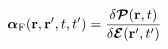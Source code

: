 \documentclass[preview]{standalone}
\begin{document}
\begin{align*}
\special{dvisvgm:raw <g id='unique000'>}\boldsymbol{\alpha}_{\rm F}(\mathbf r,\mathbf r',t,t')=\frac{\delta\boldsymbol{\mathcal P}(\mathbf r,t)}{\delta\boldsymbol{\mathcal E}(\mathbf r',t')}\special{dvisvgm:raw </g>}
\end{align*}
\end{document}
